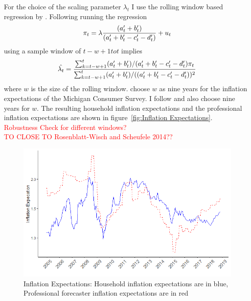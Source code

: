\documentclass[review]{elsarticle}
\begin{document}
For the choice of the scaling parameter $\lambda_t$ I use the rolling window based regression by \cite{Lahiri2015}. Following \cite{Rosenblatt-Wisch2015} running the regression
\begin{align*}
\pi_t = \lambda \frac{(a_t\sp{\prime} + b_t\sp{\prime})}{(a_t\sp{\prime} + b_t\sp{\prime} - c_t\sp{\prime} - d_t\sp{\prime})} + u_t 
\end{align*}
using a sample window of $t - w + 1 to t$ implies
\begin{align*}
\hat{\lambda_t} = \frac{\sum^t_{k = t-w+1}(a_t\sp{\prime} + b_t\sp{\prime})/(a_t\sp{\prime} + b_t\sp{\prime} - c_t\sp{\prime} - d_t\sp{\prime})\pi_t}{\sum^t_{k = t-w+1}(a_t\sp{\prime} + b_t\sp{\prime})/((a_t\sp{\prime} + b_t\sp{\prime} - c_t\sp{\prime} - d_t\sp{\prime}))^2}
\end{align*}
where $w$ is the size of the rolling window. \cite{Lahiri2015} choose $w$ as nine years for the inflation expectations of the Michigan Consumer Survey. I follow \cite{Lahiri2015} and also choose nine years for $w$. The resulting household inflation expectations and the professional inflation expectations are shown in figure~\ref{fig:Inflation Expectations}.
\\
\textcolor{red}{Robustness Check for different windows?}
\\
\textcolor{red}{TO CLOSE TO Rosenblatt-Wisch and Scheufele 2014??}

  \begin{figure}[h!]
    \centering
    \includegraphics{household_prof_inf.png}
    \caption{Inflation Expectations: Household inflation expectations are in blue, Professional forecaster inflation expectations are in red}
    \end{figure}
\label{fig:Inflation Expectations}
\end{document}
